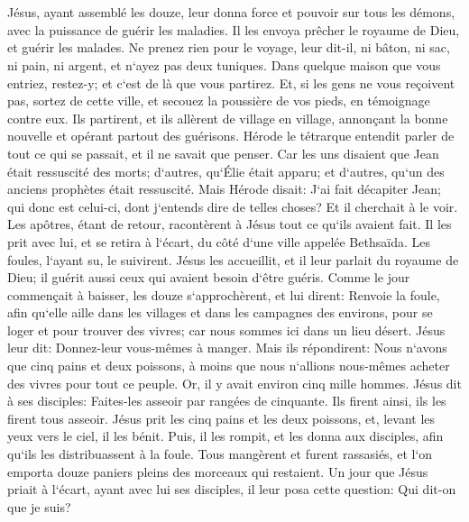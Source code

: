 \chapter{}

\verse Jésus, ayant assemblé les douze, leur donna force et pouvoir sur tous les démons, avec la puissance de guérir les maladies. 
\verse Il les envoya prêcher le royaume de Dieu, et guérir les malades. 
\verse Ne prenez rien pour le voyage, leur dit-il, ni bâton, ni sac, ni pain, ni argent, et n`ayez pas deux tuniques. 
\verse Dans quelque maison que vous entriez, restez-y; et c`est de là que vous partirez. 
\verse Et, si les gens ne vous reçoivent pas, sortez de cette ville, et secouez la poussière de vos pieds, en témoignage contre eux. 
\verse Ils partirent, et ils allèrent de village en village, annonçant la bonne nouvelle et opérant partout des guérisons. 
\verse Hérode le tétrarque entendit parler de tout ce qui se passait, et il ne savait que penser. Car les uns disaient que Jean était ressuscité des morts; 
\verse d`autres, qu`Élie était apparu; et d`autres, qu`un des anciens prophètes était ressuscité. 
\verse Mais Hérode disait: J`ai fait décapiter Jean; qui donc est celui-ci, dont j`entends dire de telles choses? Et il cherchait à le voir. 
\verse Les apôtres, étant de retour, racontèrent à Jésus tout ce qu`ils avaient fait. Il les prit avec lui, et se retira à l`écart, du côté d`une ville appelée Bethsaïda. 
\verse Les foules, l`ayant su, le suivirent. Jésus les accueillit, et il leur parlait du royaume de Dieu; il guérit aussi ceux qui avaient besoin d`être guéris. 
\verse Comme le jour commençait à baisser, les douze s`approchèrent, et lui dirent: Renvoie la foule, afin qu`elle aille dans les villages et dans les campagnes des environs, pour se loger et pour trouver des vivres; car nous sommes ici dans un lieu désert. 
\verse Jésus leur dit: Donnez-leur vous-mêmes à manger. Mais ils répondirent: Nous n`avons que cinq pains et deux poissons, à moins que nous n`allions nous-mêmes acheter des vivres pour tout ce peuple. 
\verse Or, il y avait environ cinq mille hommes. Jésus dit à ses disciples: Faites-les asseoir par rangées de cinquante. 
\verse Ils firent ainsi, ils les firent tous asseoir. 
\verse Jésus prit les cinq pains et les deux poissons, et, levant les yeux vers le ciel, il les bénit. Puis, il les rompit, et les donna aux disciples, afin qu`ils les distribuassent à la foule. 
\verse Tous mangèrent et furent rassasiés, et l`on emporta douze paniers pleins des morceaux qui restaient. 
\verse Un jour que Jésus priait à l`écart, ayant avec lui ses disciples, il leur posa cette question: Qui dit-on que je suis? 
